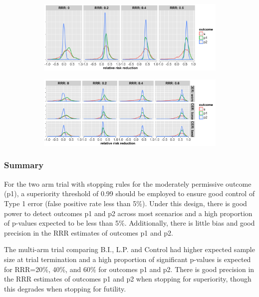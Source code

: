 \documentclass[]{article}
\begin{document}
\begin{figure}
\centering
  \caption{Distribution of relative risk reduction estimates after stopping early for superiority of (a) B.I. or (b)
  L.P. Results are presented for the control event rate (rows, BEST CASE ONLY for B.I?), four relative risk reductions (by columns) and the three outcomes (legend).}
  \begin{subfigure}{0.8\textwidth}
    \centering
    \caption{}
    \includegraphics{../plots/3arm/RRRhat_supbi_3arm.png}
  \end{subfigure}
  \bigbreak
  \begin{subfigure}{0.8\textwidth}
    \centering
    \caption{}
    \includegraphics{../plots/3arm/RRRhat_suplp_3arm.png}
  \end{subfigure}
\end{figure}

\hypertarget{summary}{%
\subsubsection{Summary}\label{summary}}

For the two arm trial with stopping rules for the moderately permissive
outcome (p1), a superiority threshold of 0.99 should be employed to
ensure good control of Type 1 error (false positive rate less than 5\%).
Under this design, there is good power to detect outcomes p1 and p2
across most scenarios and a high proportion of p-values expected to be
less than 5\%. Additionally, there is little bias and good precision in
the RRR estimates of outcomes p1 and p2.

The multi-arm trial comparing B.I., L.P. and Control had higher expected
sample size at trial termination and a high proportion of significant
p-values is expected for RRR=20\%, 40\%, and 60\% for outcomes p1 and
p2. There is good precision in the RRR estimates of outcomes p1 and p2
when stopping for superiority, though this degrades when stopping for
futility.
\end{document}
